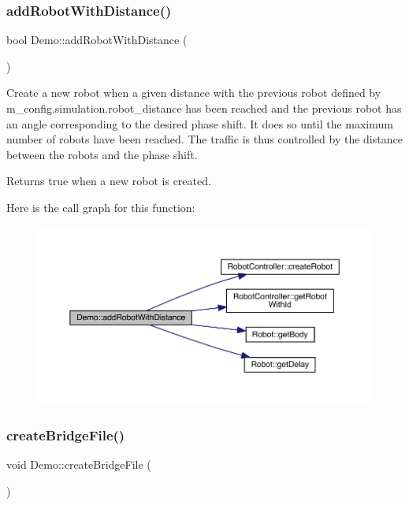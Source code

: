\subsubsection{\texorpdfstring{add\+Robot\+With\+Distance()}{addRobotWithDistance()}}
{\footnotesize\ttfamily bool Demo\+::add\+Robot\+With\+Distance (\begin{DoxyParamCaption}{ }\end{DoxyParamCaption})}

Create a new robot when a given distance with the previous robot defined by m\+\_\+config.\+simulation.\+robot\+\_\+distance has been reached and the previous robot has an angle corresponding to the desired phase shift. It does so until the maximum number of robots have been reached. The traffic is thus controlled by the distance between the robots and the phase shift. \begin{DoxyReturn}{Returns}
true when a new robot is created. 
\end{DoxyReturn}
Here is the call graph for this function\+:\nopagebreak
\begin{figure}[H]
\begin{center}
\leavevmode
\includegraphics[width=350pt]{class_demo_a37b03d288a1bf67f586cdfe1f9ba16af_cgraph}
\end{center}
\end{figure}
\mbox{\label{class_demo_ae0f7fe82aa44b946c13823d408b9ee01}} 
\subsubsection{\texorpdfstring{create\+Bridge\+File()}{createBridgeFile()}}
{\footnotesize\ttfamily void Demo\+::create\+Bridge\+File (\begin{DoxyParamCaption}{ }\end{DoxyParamCaption})}

